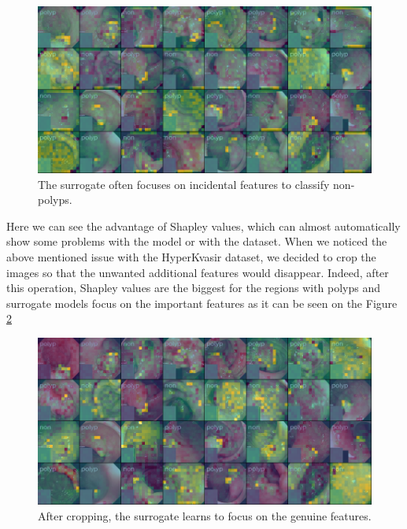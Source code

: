\documentclass[magisterska,en]{pracamgr}
\begin{document}
\begin{figure}[H]
\centering
\includegraphics[scale=0.5]{./images/shap_gastro_edges.png}
\caption{The surrogate often focuses on incidental features to classify non-polyps.}
\label{Shapley values gastro}
\end{figure}




Here we can see the advantage of Shapley values, which can almost automatically show some problems with the model or with the dataset.
When we noticed the above mentioned issue with the HyperKvasir dataset, we decided to crop the images so that the unwanted additional features would disappear. Indeed, after this operation, Shapley values are the biggest for the regions with polyps and surrogate models focus on the important features as it can be seen on the Figure
\ref{Shapley values for 196 players cropped gastro}

\begin{figure}[H]
\centering
\includegraphics[scale=0.5]{./images/cropped_shap_gastro.png}
\caption{After cropping, the surrogate learns to focus on the genuine features.}
\label{Shapley values for 196 players cropped gastro}
\end{figure}
\end{document}
